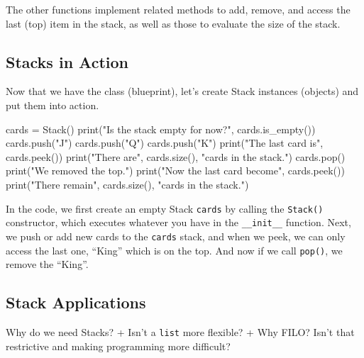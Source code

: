 \documentclass[
  letterpaper,
]{scrbook}
\newenvironment{Shaded}{\begin{snugshade}}{\end{snugshade}}
\newcommand{\BuiltInTok}[1]{\textcolor[rgb]{0.00,0.23,0.31}{#1}}
\newcommand{\NormalTok}[1]{\textcolor[rgb]{0.00,0.23,0.31}{#1}}
\newcommand{\OperatorTok}[1]{\textcolor[rgb]{0.37,0.37,0.37}{#1}}
\newcommand{\StringTok}[1]{\textcolor[rgb]{0.13,0.47,0.30}{#1}}
\begin{document}
The other functions implement related methods to add, remove, and access
the last (top) item in the stack, as well as those to evaluate the size
of the stack.

\subsection*{Stacks in Action}\label{stacks-in-action}

Now that we have the class (blueprint), let's create Stack instances
(objects) and put them into action.

\begin{Shaded}
\begin{Highlighting}[]
\NormalTok{cards }\OperatorTok{=}\NormalTok{ Stack()}
\BuiltInTok{print}\NormalTok{(}\StringTok{"Is the stack empty for now?"}\NormalTok{, cards.is\_empty())}
\NormalTok{cards.push(}\StringTok{"J"}\NormalTok{)}
\NormalTok{cards.push(}\StringTok{"Q"}\NormalTok{)}
\NormalTok{cards.push(}\StringTok{"K"}\NormalTok{)}
\BuiltInTok{print}\NormalTok{(}\StringTok{"The last card is"}\NormalTok{, cards.peek())}
\BuiltInTok{print}\NormalTok{(}\StringTok{"There are"}\NormalTok{, cards.size(), }\StringTok{"cards in the stack."}\NormalTok{)}
\NormalTok{cards.pop()}
\BuiltInTok{print}\NormalTok{(}\StringTok{"We removed the top."}\NormalTok{)}
\BuiltInTok{print}\NormalTok{(}\StringTok{"Now the last card become"}\NormalTok{, cards.peek())}
\BuiltInTok{print}\NormalTok{(}\StringTok{"There remain"}\NormalTok{, cards.size(), }\StringTok{"cards in the stack."}\NormalTok{)}
\end{Highlighting}
\end{Shaded}

In the code, we first create an empty Stack \texttt{cards} by calling
the \texttt{Stack()} constructor, which executes whatever you have in
the \texttt{\_\_init\_\_} function. Next, we push or add new cards to
the \texttt{cards} stack, and when we peek, we can only access the last
one, ``King'' which is on the top. And now if we call \texttt{pop()}, we
remove the ``King''.

\subsection*{Stack Applications}\label{stack-applications}

Why do we need Stacks? + Isn't a \texttt{list} more flexible? + Why
FILO? Isn't that restrictive and making programming more difficult?
\end{document}
